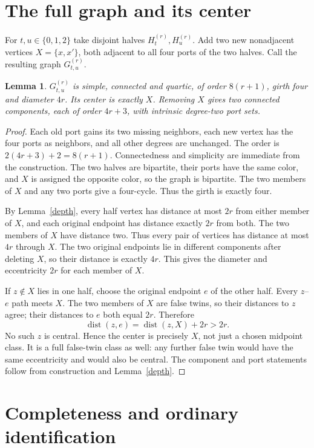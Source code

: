 \documentclass[11pt]{article}
\newtheorem{lemma}[theorem]{Lemma}
\theoremstyle{definition}\newtheorem{definition}[theorem]{Definition}
\newcommand{\dist}{\operatorname{dist}}
\begin{document}
\section{The full graph and its center}

For $t,u\in\{0,1,2\}$ take disjoint halves
$H_t^{(r)},H_u^{(r)}$. Add two new nonadjacent vertices
$X=\{x,x'\}$, both adjacent to all four ports of the two halves.
Call the resulting graph $G_{t,u}^{(r)}$.

\begin{lemma}\label{metric}
$G_{t,u}^{(r)}$ is simple, connected and quartic, of order $8(r+1)$,
girth four and diameter $4r$. Its center is exactly $X$. Removing
$X$ gives two connected components, each of order $4r+3$, with
intrinsic degree-two port sets.
\end{lemma}
\begin{proof}
Each old port gains its two missing neighbors, each new vertex
has the four ports as neighbors, and all other degrees are unchanged.
The order is $2(4r+3)+2=8(r+1)$. Connectedness and simplicity are
immediate from the construction. The two halves are bipartite,
their ports have the same color, and $X$ is assigned the opposite
color, so the graph is bipartite. The two members of $X$ and any
two ports give a four-cycle. Thus the girth is exactly four.

By Lemma~\ref{depth}, every half vertex has distance at most $2r$
from either member of $X$, and each original endpoint has distance
exactly $2r$ from both. The two members of $X$ have distance two.
Thus every pair of vertices has distance at most $4r$ through $X$.
The two original endpoints lie in different components after
deleting $X$, so their distance is exactly $4r$. This gives the
diameter and eccentricity $2r$ for each member of $X$.

If $z\notin X$ lies in one half, choose the original endpoint
$e$ of the other half. Every $z$--$e$ path meets $X$. The two
members of $X$ are false twins, so their distances to $z$ agree;
their distances to $e$ both equal $2r$. Therefore
\[
 \dist(z,e)=\dist(z,X)+2r>2r.
\]
No such $z$ is central. Hence the center is precisely $X$, not
just a chosen midpoint class. It is a full false-twin class as well:
any further false twin would have the same eccentricity and would
also be central. The component and port statements
follow from construction and Lemma~\ref{depth}.
\end{proof}

\section{Completeness and ordinary identification}
\end{document}
